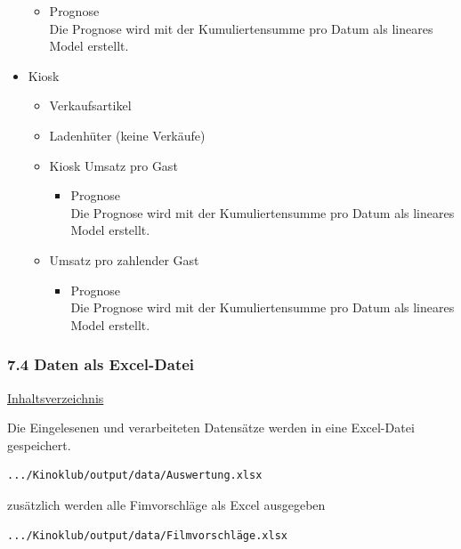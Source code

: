 \documentclass[
]{article}
\providecommand{\tightlist}{%
  \setlength{\itemsep}{0pt}\setlength{\parskip}{0pt}}
\begin{document}
\begin{itemize}
  \begin{itemize}
  \tightlist
  \item
    Prognose\\
    Die Prognose wird mit der Kumuliertensumme pro Datum als lineares
    Model erstellt.
  \end{itemize}
\item
  Kiosk

  \begin{itemize}
  \tightlist
  \item
    Verkaufsartikel
  \item
    Ladenhüter (keine Verkäufe)
  \item
    Kiosk Umsatz pro Gast

    \begin{itemize}
    \tightlist
    \item
      Prognose\\
      Die Prognose wird mit der Kumuliertensumme pro Datum als lineares
      Model erstellt.
    \end{itemize}
  \item
    Umsatz pro zahlender Gast

    \begin{itemize}
    \tightlist
    \item
      Prognose\\
      Die Prognose wird mit der Kumuliertensumme pro Datum als lineares
      Model erstellt.
    \end{itemize}
  \end{itemize}
\end{itemize}

\subsubsection{7.4 Daten als Excel-Datei}\label{daten-als-excel-datei}

\hyperref[Inhaltsverzeichnis]{Inhaltsverzeichnis}

Die Eingelesenen und verarbeiteten Datensätze werden in eine Excel-Datei
gespeichert.\\

\begin{verbatim}
.../Kinoklub/output/data/Auswertung.xlsx
\end{verbatim}

zusätzlich werden alle Fimvorschläge als Excel ausgegeben

\begin{verbatim}
.../Kinoklub/output/data/Filmvorschläge.xlsx
\end{verbatim}
\end{document}
